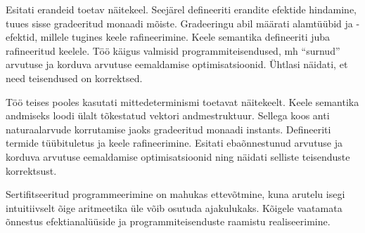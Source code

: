 \documentclass[a4paper,12pt]{article}
\begin{document}
Esitati erandeid toetav näitekeel.
Seejärel defineeriti erandite efektide hindamine, tuues sisse gradeeritud monaadi mõiste.
Gradeeringu abil määrati alamtüübid ja -efektid, millele tugines keele rafineerimine.
Keele semantika defineeriti juba rafineeritud keelele.
Töö käigus valmisid programmiteisendused, mh ``surnud'' arvutuse ja korduva arvutuse eemaldamise optimisatsioonid.
Ühtlasi näidati, et need teisendused on korrektsed.

Töö teises pooles kasutati mittedeterminismi toetavat näitekeelt.
Keele semantika andmiseks loodi ülalt tõkestatud vektori andmestruktuur.
Sellega koos anti naturaalarvude korrutamise jaoks gradeeritud monaadi instants.
Defineeriti termide tüübituletus ja keele rafineerimine.
Esitati ebaõnnestunud arvutuse ja korduva arvutuse eemaldamise optimisatsioonid ning näidati selliste teisenduste korrektsust.

Sertifitseeritud programmeerimine on mahukas ettevõtmine, kuna arutelu isegi intuitiivselt õige aritmeetika üle võib osutuda ajakulukaks.
Kõigele vaatamata õnnestus efektianalüüside ja programmiteisenduste raamistu realiseerimine.

\clearpage\vspace*{0pt}

\renewcommand{\baselinestretch}{1.15}
\small


\end{document}
